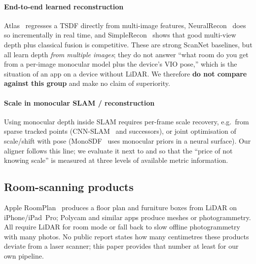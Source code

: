\paragraph{End-to-end learned reconstruction} Atlas~\cite{atlas} regresses a TSDF directly from multi-image features,
NeuralRecon~\cite{neuralrecon} does so incrementally in real time, and SimpleRecon~\cite{simplerecon} shows that good
multi-view depth plus classical fusion is competitive. These are strong ScanNet baselines, but all learn depth
\emph{from multiple images}; they do not answer ``what room do you get from a per-image monocular model plus the
device's VIO pose,'' which is the situation of an app on a device without LiDAR. We therefore \textbf{do not compare
against this group} and make no claim of superiority.

\paragraph{Scale in monocular SLAM / reconstruction} Using monocular depth inside SLAM requires per-frame scale
recovery, e.g.\ from sparse tracked points (CNN-SLAM~\cite{cnnslam} and successors), or joint optimisation of
scale/shift with pose (MonoSDF~\cite{monosdf} uses monocular priors in a neural surface). Our 
aligner follows this line; we evaluate it next to  and  so that the ``price of not
knowing scale'' is measured at three levels of available metric information.

\subsection{Room-scanning products}
Apple RoomPlan~\cite{roomplan} produces a floor plan and furniture boxes from LiDAR on iPhone/iPad~Pro; Polycam and
similar apps produce meshes or photogrammetry. All require LiDAR for room mode or fall back to slow offline
photogrammetry with many photos. No public report states how many centimetres these products deviate from a laser
scanner; this paper provides that number at least for our own pipeline.


